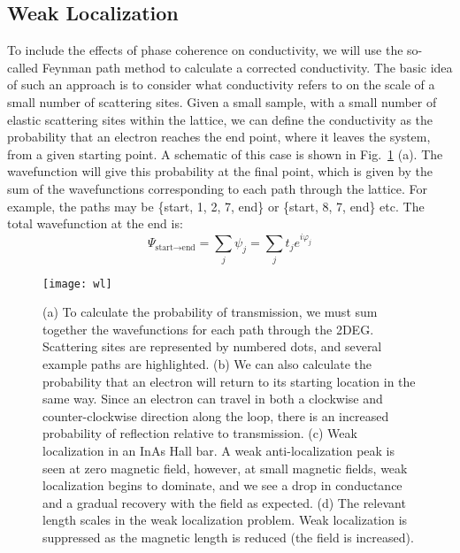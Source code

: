 \subsection{Weak Localization}
\label{sec:wl}
To include the effects of phase coherence on conductivity, we will use the so-called Feynman path method to calculate
a corrected conductivity. The basic idea of such an approach is to consider what conductivity refers to on the scale of a small number of scattering sites. Given a small sample, with a small number of elastic scattering sites within the lattice,
we can define the conductivity as the probability that an electron reaches the end point, where it leaves the system,
from a given starting point. A schematic of this case is shown in Fig.~\ref{fig:WL} (a). The wavefunction will give this probability at the final point, which is given by the sum of the wavefunctions corresponding
to each path through the lattice. For example, the paths may be \{start, 1, 2, 7, end\} or \{start, 8, 7, end\} etc. The total wavefunction at the end is:
\begin{equation}
  \Psi_{\textrm{start}\rightarrow\textrm{end}} = \sum_j \psi_j = \sum_j t_j e^{i \varphi_j}
\end{equation}

\begin{figure}
  \texttt{[image: wl]}
  \caption[Weak localization]
  {\label{fig:WL}(a) To calculate the probability of transmission, we must sum together the wavefunctions for each path through the 2DEG. Scattering sites are represented by numbered dots, and several example paths are highlighted.
  (b) We can also calculate the probability that an electron will return to its starting location in the same way. Since an electron can travel in both a clockwise and counter-clockwise direction along the loop, there is an increased probability of reflection relative to transmission.
  (c) Weak localization in an InAs Hall bar. A weak anti-localization peak is seen at zero magnetic field, however, at small magnetic fields, weak localization begins to dominate, and we see a drop in conductance and a gradual recovery with the field as expected. (d) The relevant length scales in the weak localization problem. Weak localization is suppressed as the magnetic length is reduced (the field is increased).}
\end{figure}

